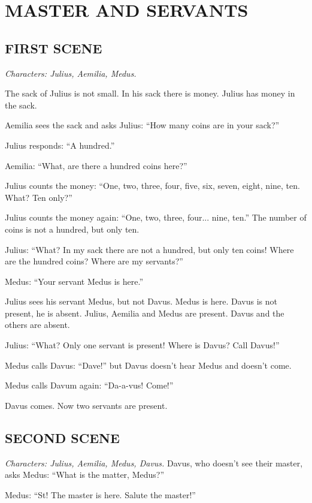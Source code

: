 
\chapter{MASTER AND SERVANTS}

\linenumbers[1]

\section[First scene]{FIRST SCENE}
\emph{Characters: Julius, Aemilia, Medus.}

The sack of Julius is not small. In his sack there is money. Julius has money in the sack.

Aemilia sees the sack and asks Julius: ``How many coins are in your sack?''

Julius responds: ``A hundred.''

Aemilia: ``What, are there a hundred coins here?''

Julius counts the money: ``One, two, three, four, five, six, seven, eight, nine, ten. What? Ten only?''

Julius counts the money again: ``One, two, three, four... nine, ten.'' The number of coins is not a hundred, but only ten.

Julius: ``What? In my sack there are not a hundred, but only ten coins! Where are the hundred coins? Where are my servants?''

Medus: ``Your servant Medus is here.''

Julius sees his servant Medus, but not Davus. Medus is here. Davus is not present, he is absent. Julius, Aemilia and Medus are present. Davus and the others are absent.

Julius: ``What? Only one servant is present! Where is Davus? Call Davus!''

Medus calls Davus: ``Dave!'' but Davus doesn't hear Medus and doesn't come.

Medus calls Davum again: ``Da-a-vus! Come!''

Davus comes. Now two servants are present.

\section[Second scene]{SECOND SCENE}
\emph{Characters: Julius, Aemilia, Medus, Davus.}
Davus, who doesn't see their master, asks Medus: ``What is the matter, Medus?''

Medus: ``St! The master is here. Salute the master!''


